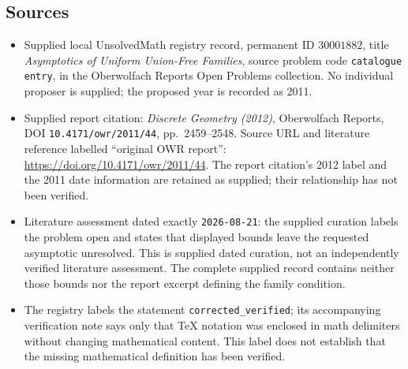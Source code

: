 \documentclass[11pt]{article}
\begin{document}
\subsection{Sources}
\begin{itemize}
\item Supplied local UnsolvedMath registry record, permanent ID \(30001882\), title \emph{Asymptotics of Uniform Union-Free Families}, source problem code \texttt{catalogue entry}, in the Oberwolfach Reports Open Problems collection. No individual proposer is supplied; the proposed year is recorded as 2011.
\item Supplied report citation: \emph{Discrete Geometry (2012)}, Oberwolfach Reports, DOI \texttt{10.4171/owr/2011/44}, pp.\ 2459--2548. Source URL and literature reference labelled ``original OWR report'': \url{https://doi.org/10.4171/owr/2011/44}. The report citation's 2012 label and the 2011 date information are retained as supplied; their relationship has not been verified.
\item Literature assessment dated exactly \texttt{2026-08-21}: the supplied curation labels the problem open and states that displayed bounds leave the requested asymptotic unresolved. This is supplied dated curation, not an independently verified literature assessment. The complete supplied record contains neither those bounds nor the report excerpt defining the family condition.
\item The registry labels the statement \texttt{corrected\_verified}; its accompanying verification note says only that TeX notation was enclosed in math delimiters without changing mathematical content. This label does not establish that the missing mathematical definition has been verified.
\end{itemize}
\end{document}
